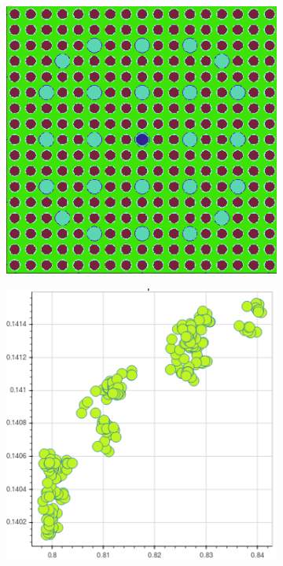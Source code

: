\clearpage

\begin{figure}[h!]
\centering
\begin{subfigure}{0.42\textwidth}
  \centering
  \includegraphics[width=0.9\linewidth]{figures/unsupervised/features/assm-16/geometry}
  \caption{}
  \label{fig:chap10-capt-mean-nuc-frac-geom}
\end{subfigure}%
\begin{subfigure}{0.42\textwidth}
  \centering
  \includegraphics[width=0.9\linewidth]{figures/unsupervised/features/assm-16/u238-capt/mean-nuc-frac/mgxs}

\end{subfigure}
\end{figure}

